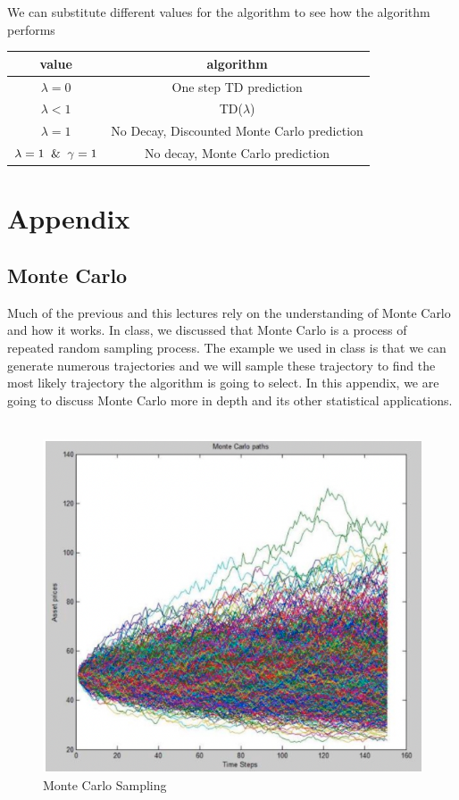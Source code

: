 \documentclass[11pt]{article}
\begin{document}
We can substitute different values for the algorithm to see how the algorithm performs
\begin{center}
\begin{tabular}{||c c||} 
 \hline
 value & algorithm \\ [0.5ex] 
 \hline\hline
 $\lambda = 0$ & One step TD prediction  \\ 
 \hline
 $\lambda < 1$ & TD($\lambda$) \\
 \hline
 $\lambda = 1$ & No Decay, Discounted Monte Carlo prediction \\
 \hline
 $\lambda = 1 \And \gamma = 1$ & No decay, Monte Carlo prediction \\
 \hline
\end{tabular}
\end{center}
\section{Appendix}

\subsection{Monte Carlo}
Much of the previous and this lectures rely on the understanding of Monte Carlo and how it works. In class, we discussed that Monte Carlo is a process of repeated random sampling process. The example we used in class is that we can generate numerous trajectories and we will sample these trajectory to find the most likely trajectory the algorithm is going to select. In this appendix, we are going to discuss Monte Carlo more in depth and its other statistical applications.\\ \\
\begin{figure}[H]
    \centering
    \includegraphics[width=0.35\linewidth]{images/Monte Carlo Sampling .png}
    \caption{Monte Carlo Sampling}
    \label{fig:lambda-return_params}
\end{figure}
\end{document}
